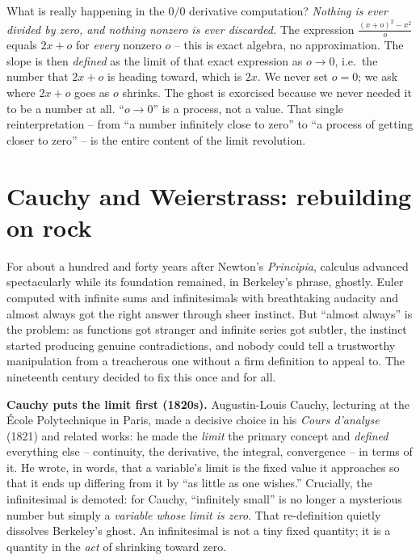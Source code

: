 \begin{happeningbox}
What is really happening in the $0/0$ derivative computation? \emph{Nothing is ever divided by
zero, and nothing nonzero is ever discarded.} The expression $\frac{(x+o)^2-x^2}{o}$ equals
$2x+o$ for \emph{every} nonzero $o$ -- this is exact algebra, no approximation. The slope is then
\emph{defined} as the limit of that exact expression as $o\to 0$, i.e.\ the number that $2x+o$ is
heading toward, which is $2x$. We never set $o=0$; we ask where $2x+o$ goes as $o$ shrinks. The
ghost is exorcised because we never needed it to be a number at all. ``$o\to 0$'' is a process,
not a value. That single reinterpretation -- from ``a number infinitely close to zero'' to ``a
process of getting closer to zero'' -- is the entire content of the limit revolution.
\end{happeningbox}

\section{Cauchy and Weierstrass: rebuilding on rock}

For about a hundred and forty years after Newton's \emph{Principia}, calculus advanced
spectacularly while its foundation remained, in Berkeley's phrase, ghostly. Euler computed with
infinite sums and infinitesimals with breathtaking audacity and almost always got the right
answer through sheer instinct. But ``almost always'' is the problem: as functions got stranger
and infinite series got subtler, the instinct started producing genuine contradictions, and
nobody could tell a trustworthy manipulation from a treacherous one without a firm definition to
appeal to. The nineteenth century decided to fix this once and for all.

\begin{historybox}
\textbf{Cauchy puts the limit first (1820s).} Augustin-Louis Cauchy, lecturing at the
\'Ecole Polytechnique in Paris, made a decisive choice in his \emph{Cours d'analyse} (1821) and
related works: he made the \emph{limit} the primary concept and \emph{defined} everything else --
continuity, the derivative, the integral, convergence -- in terms of it. He wrote, in words,
that a variable's limit is the fixed value it approaches so that it ends up differing from it by
``as little as one wishes.'' Crucially, the infinitesimal is demoted: for Cauchy, ``infinitely
small'' is no longer a mysterious number but simply a \emph{variable whose limit is zero}. That
re-definition quietly dissolves Berkeley's ghost. An infinitesimal is not a tiny fixed quantity;
it is a quantity in the \emph{act} of shrinking toward zero.
\end{historybox}

